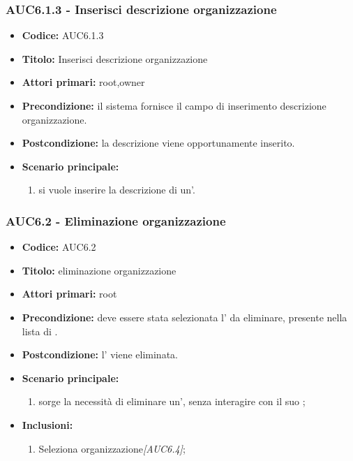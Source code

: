 \documentclass[casi-duso]{subfiles}
\begin{document}
  \subsubsection{AUC6.1.3 - Inserisci descrizione organizzazione}%
  \label{subsub:AUC6.1.3}
  \begin{itemize}
    \item \textbf{Codice:} AUC6.1.3
    \item \textbf{Titolo:} Inserisci descrizione organizzazione
    \item \textbf{Attori primari:} root,owner
    \item \textbf{Precondizione:} il sistema fornisce il campo di inserimento descrizione organizzazione.
    \item \textbf{Postcondizione:} la descrizione viene opportunamente inserito.
    \item \textbf{Scenario principale:}
    \begin{enumerate}
      \item si vuole inserire la descrizione di un'.
    \end{enumerate}
  \end{itemize}



\subsubsection{AUC6.2 - Eliminazione organizzazione}%
\label{subsub:AUC6.2}
\begin{itemize}
  \item \textbf{Codice:} AUC6.2
  \item \textbf{Titolo:} eliminazione organizzazione
  \item \textbf{Attori primari:} root
  \item \textbf{Precondizione:} deve essere stata selezionata l' da eliminare, presente nella lista di .
  \item \textbf{Postcondizione:} l' viene eliminata.
  \item \textbf{Scenario principale:}
  \begin{enumerate}
    \item sorge la necessità di eliminare un', senza interagire con il suo ;
  \end{enumerate}
  \item \textbf{Inclusioni:}
  \begin{enumerate}
    \item Seleziona organizzazione\emph{[AUC6.4]};
  \end{enumerate}
\end{itemize}
\end{document}
